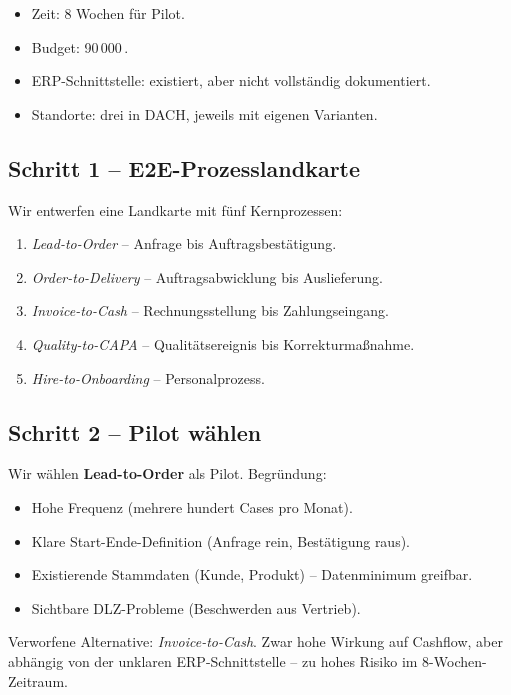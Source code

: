 \documentclass[11pt,a4paper,oneside]{article}
\newcommand{\fachbegriff}[1]{\textbf{#1}}
\begin{document}
\begin{itemize}
  \item Zeit: 8 Wochen für Pilot.
  \item Budget: 90\,000\,\text{\euro}.
  \item ERP-Schnittstelle: existiert, aber nicht vollständig dokumentiert.
  \item Standorte: drei in DACH, jeweils mit eigenen Varianten.
\end{itemize}

\subsection{Schritt 1 -- E2E-Prozesslandkarte}

Wir entwerfen eine Landkarte mit fünf Kernprozessen:

\begin{enumerate}
  \item \emph{Lead-to-Order} -- Anfrage bis Auftragsbestätigung.
  \item \emph{Order-to-Delivery} -- Auftragsabwicklung bis Auslieferung.
  \item \emph{Invoice-to-Cash} -- Rechnungsstellung bis Zahlungseingang.
  \item \emph{Quality-to-CAPA} -- Qualitätsereignis bis Korrekturmaßnahme.
  \item \emph{Hire-to-Onboarding} -- Personalprozess.
\end{enumerate}

\subsection{Schritt 2 -- Pilot wählen}

Wir wählen \fachbegriff{Lead-to-Order} als Pilot. Begründung:

\begin{itemize}
  \item Hohe Frequenz (mehrere hundert Cases pro Monat).
  \item Klare Start-Ende-Definition (Anfrage rein, Bestätigung raus).
  \item Existierende Stammdaten (Kunde, Produkt) -- Datenminimum greifbar.
  \item Sichtbare DLZ-Probleme (Beschwerden aus Vertrieb).
\end{itemize}

Verworfene Alternative: \emph{Invoice-to-Cash}. Zwar hohe Wirkung auf Cashflow, aber abhängig von der unklaren ERP-Schnittstelle -- zu hohes Risiko im 8-Wochen-Zeitraum.
\end{document}
